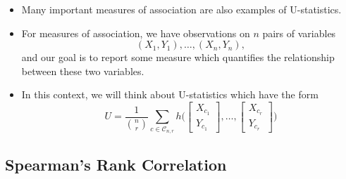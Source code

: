 \documentclass[]{book}
\begin{document}
\begin{itemize}
\item
  Many important measures of association are also examples of U-statistics.
\item
  For measures of association, we have observations on \(n\) pairs of variables
  \begin{equation}
  (X_{1}, Y_{1}), \ldots, (X_{n}, Y_{n}), \nonumber 
  \end{equation}
  and our goal is to report some measure which quantifies the relationship between these
  two variables.
\item
  In this context, we will think about U-statistics which have the form
  \begin{equation}
  U = \frac{1}{{n \choose r}} \sum_{c \in \mathcal{C}_{n,r} } h\Bigg( \begin{bmatrix} X_{c_{1}} \\ Y_{c_{1}} \end{bmatrix},
  \ldots, \begin{bmatrix} X_{c_{r}} \\ Y_{c_{r}} \end{bmatrix} \Bigg)
  \end{equation}
\end{itemize}

\hypertarget{spearmans-rank-correlation}{%
\subsection{Spearman's Rank Correlation}\label{spearmans-rank-correlation}}
\end{document}
